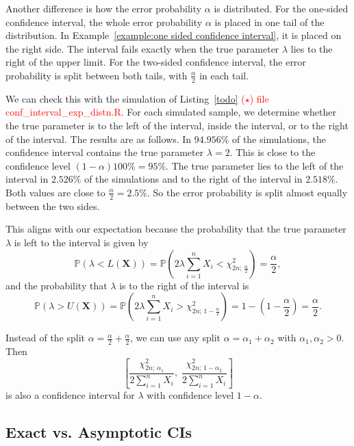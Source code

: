 \begin{example}
Another difference is how the error probability $\alpha$ is distributed.
For the one-sided confidence interval, the whole error probability $\alpha$
is placed in one tail of the distribution. In
Example~\ref{example:one sided confidence interval}, it is placed on the
right side. The interval fails exactly when the true parameter $\lambda$
lies to the right of the upper limit. For the two-sided confidence interval,
the error probability is split between both tails, with $\frac{\alpha}{2}$ in each tail.

We can check this with the simulation of Listing~\ref{todo}
\textcolor{red}{($\star$) file conf\_interval\_exp\_distn.R}. For each
simulated sample, we determine whether the true parameter is to the left of the
interval, inside the interval, or to the right of the interval. The results are
as follows. In $94.956\%$ of the simulations, the confidence interval contains
the true parameter $\lambda = 2$. This is close to the confidence level
$(1 - \alpha) 100\% = 95\%$. The true parameter lies to the left of the interval in
$2.526\%$ of the simulations and to the right of the interval in $2.518\%$.
Both values are close to $\frac{\alpha}{2} = 2.5\%$. So the error probability is
split almost equally between the two sides.

This aligns with our expectation because the probability that the true parameter $\lambda$ is left to the interval is given by
\[
\mathbb{P} (\lambda < L \left( \mathbf X \right))
= \mathbb{P} \left( 2\lambda \sum_{i = 1}^n X_i < \chi^2_{2n;\,\frac{\alpha}{2}} \right)
= \frac{\alpha}{2},
\]
and the probability that $\lambda$ is to the right of the interval is
\[
\mathbb{P}(\lambda > U(\mathbf X))
= \mathbb{P} \left( 2\lambda \sum_{i = 1}^n X_i > \chi^2_{2n;\,1- \frac{\alpha}{2}} \right)
= 1 - \left( 1 - \frac{\alpha}{2} \right)
= \frac{\alpha}{2}.
\]

Instead of the split $\alpha = \frac{\alpha}{2} + \frac{\alpha}{2}$, we can use any
split $\alpha = \alpha_1 + \alpha_2$ with $\alpha_1, \alpha_2 > 0$. Then
\[
	\left[
		\frac{\chi^2_{2n;\,\alpha_1}}{2 \sum_{i = 1}^n X_i} ,\;
		\frac{\chi^2_{2n;\,1 - \alpha_2}}{2 \sum_{i = 1}^n X_i}
	\right]
\]
is also a confidence interval for $\lambda$ with confidence level $1 - \alpha$.

\end{example}



\subsection{Exact vs. Asymptotic CIs}

